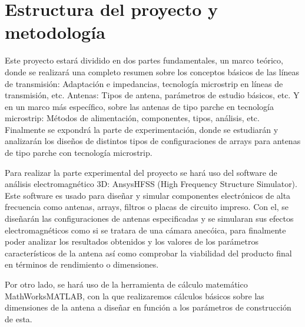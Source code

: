 \section{Estructura del proyecto y metodología}
\label{sec:medodologia}
\par Este proyecto estará dividido en dos partes fundamentales, un marco teórico, donde se realizará una completo resumen sobre los conceptos básicos de las líneas de transmisión: Adaptación e impedancias, tecnología microstrip en líneas de transmisión, etc. Antenas: Tipos de antena, parámetros de estudio básicos, etc. Y en un marco más específico, sobre las antenas de tipo parche en tecnología microstrip: Métodos de alimentación, componentes, tipos, análisis, etc. Finalmente se expondrá la parte de experimentación, donde se estudiarán y analizarán los diseños de distintos tipos de configuraciones de arrays para antenas de tipo parche con tecnología microstrip.
\\
\par Para realizar la parte experimental del proyecto se hará uso del software de análisis electromagnético 3D: Ansys\textregistered HFSS (High Frequency Structure Simulator). Este software es usado para diseñar y simular componentes electrónicos de alta frecuencia como antenas, arrays, filtros o placas de circuito impreso. Con el, se diseñarán las configuraciones de antenas especificadas y se simularan sus efectos electromagnéticos como si se tratara de una cámara anecóica, para finalmente poder analizar los resultados obtenidos y los valores de los parámetros característicos de la antena así como comprobar la viabilidad del producto final en términos de rendimiento o dimensiones.
\\
\par Por otro lado, se hará uso de la herramienta de cálculo matemático MathWorks\textregistered MATLAB, con la que realizaremos cálculos básicos sobre las dimensiones de la antena a diseñar en función a los parámetros de construcción de esta.
